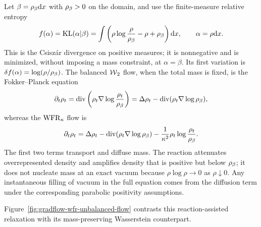 \begin{example}\label{ex-wfr-kl-flow}
	Let $\beta=\rho_{\beta}\mathrm{d} x$ with $\rho_{\beta}>0$ on the domain, and use the finite-measure relative entropy
	\[
		f(\alpha)=\operatorname{KL}(\alpha|\beta)
		=
		\int
			\left(\rho\log\frac{\rho}{\rho_{\beta}}-\rho+\rho_{\beta}\right)\mathrm{d} x,
		\qquad
		\alpha=\rho\mathrm{d} x.
	\]
	This is the Csisz{\'a}r divergence on positive measures; it is nonnegative and is minimized, without imposing a mass constraint, at $\alpha=\beta$. Its first variation is $\delta f(\alpha)=\log(\rho/\rho_{\beta})$. The balanced $\operatorname{\mathcal{W}}_2$ flow, when the total mass is fixed, is the Fokker--Planck equation
	\[
		\partial_t\rho_t
		=
			\operatorname{div}\left(\rho_t\nabla\log\frac{\rho_t}{\rho_{\beta}}\right)
			=
			\Delta\rho_t-\operatorname{div}(\rho_t\nabla\log\rho_{\beta}),
	\]
	whereas the $\operatorname{WFR}_\kappa$ flow is
	\begin{equation}\label{eq-wfr-kl-flow}
		\partial_t\rho_t
		=
			\Delta\rho_t-\operatorname{div}(\rho_t\nabla\log\rho_{\beta})
			-
			\frac{1}{\kappa^2}\rho_t\log\frac{\rho_t}{\rho_{\beta}}.
	\end{equation}
	The first two terms transport and diffuse mass. The reaction attenuates overrepresented density and amplifies density that is positive but below $\rho_{\beta}$; it does not nucleate mass at an exact vacuum because $\rho\log\rho\to0$ as $\rho\downarrow0$. Any instantaneous filling of vacuum in the full equation comes from the diffusion term under the corresponding parabolic positivity assumptions.
\end{example}

Figure~\ref{fig:gradflow-wfr-unbalanced-flow} contrasts this reaction-assisted relaxation with its mass-preserving Wasserstein counterpart.

